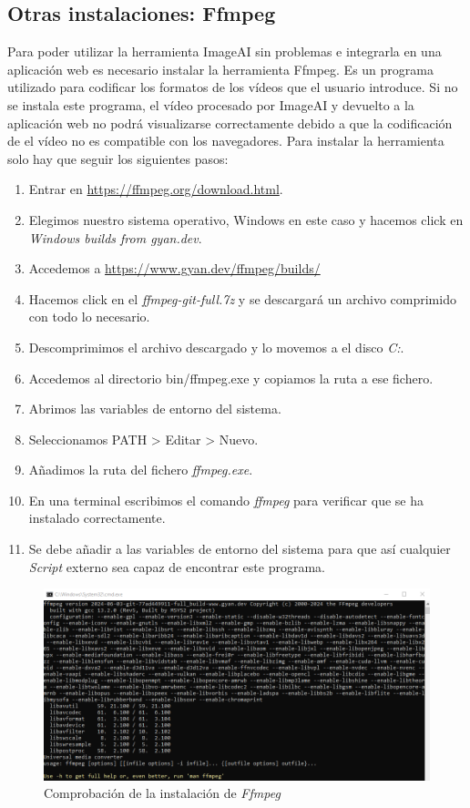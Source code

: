\subsection{Otras instalaciones: Ffmpeg}
Para poder utilizar la herramienta ImageAI sin problemas e integrarla en una aplicación web es necesario instalar la herramienta Ffmpeg. Es un programa utilizado para codificar los formatos de los vídeos que el usuario introduce. Si no se instala este programa, el vídeo procesado por ImageAI y devuelto a la aplicación web no podrá visualizarse correctamente debido a que la codificación de el vídeo no es compatible con los navegadores.
Para instalar la herramienta solo hay que seguir los siguientes pasos:
\begin{enumerate}
    \item Entrar en \href{https://ffmpeg.org/download.html}{https://ffmpeg.org/download.html}.
    \item Elegimos nuestro sistema operativo, Windows en este caso y hacemos click en \textit{Windows builds from gyan.dev}.
    \item Accedemos a \href{https://www.gyan.dev/ffmpeg/builds/} {https://www.gyan.dev/ffmpeg/builds/}
    \item Hacemos click en el \textit{ffmpeg-git-full.7z} y se descargará un archivo comprimido con todo lo necesario.
    \item Descomprimimos el archivo descargado y lo movemos a el disco \textit{C:}.
    \item Accedemos al directorio bin/ffmpeg.exe y copiamos la ruta a ese fichero.
    \item Abrimos las variables de entorno del sistema.
    \item Seleccionamos PATH > Editar > Nuevo.
    \item Añadimos la ruta del fichero \textit{ffmpeg.exe}.
    \item En una terminal escribimos el comando \textit{ffmpeg} para verificar que se ha instalado correctamente.
    \item Se debe añadir a las variables de entorno del sistema para que así cualquier \textit{Script} externo sea capaz de encontrar este programa.
\end{enumerate}
\begin{figure}[H]
    \centering
    \includegraphics[width=0.85\linewidth]{img/ffmpeg.png}
    \caption{Comprobación de la instalación de \textit{Ffmpeg}}
    \label{fig:enter-label}
\end{figure}

